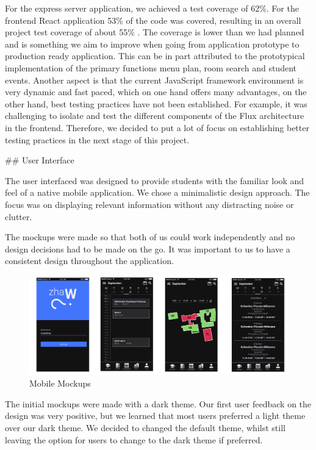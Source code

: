 \begin{markdown}
For the express server application, we achieved a test coverage of 62\%. For the frontend React application 53\% of the code was covered, resulting in an overall project test coverage of about 55\% \cite{OurCoverage}. The coverage is lower than we had planned and is something we aim to improve when going from application prototype to production ready application. This can be in part attributed to the prototypical implementation of the primary functions menu plan, room search and student events. Another aspect is that the current JavaScript framework environment is very dynamic and fast paced, which on one hand offers many advantages, on the other hand, best testing practices have not been established. For example, it was challenging to isolate and test the different components of the Flux architecture in the frontend. Therefore, we decided to put a lot of focus on establishing better testing practices in the next stage of this project.

\newpage

## User Interface

The user interfaced was designed to provide students with the familiar look and feel of a native mobile application. We chose a minimalistic design approach. The focus was on displaying relevant information without any distracting noise or clutter.

The mockups were made so that both of us could work independently and no design decisions had to be made on the go. It was important to us to have a consistent design throughout the application.

\begin{figure}[H]
  \includegraphics[width=16cm, center]{../Mockups/Mobile_Mockups.png}
  \caption{\textsf{Mobile Mockups}}
\end{figure}

The initial mockups were made with a dark theme. Our first user feedback on the design was very positive, but we learned that most users preferred a light theme over our dark theme. We decided to changed the default theme, whilst still leaving the option for users to change to the dark theme if preferred.


\end{markdown}
